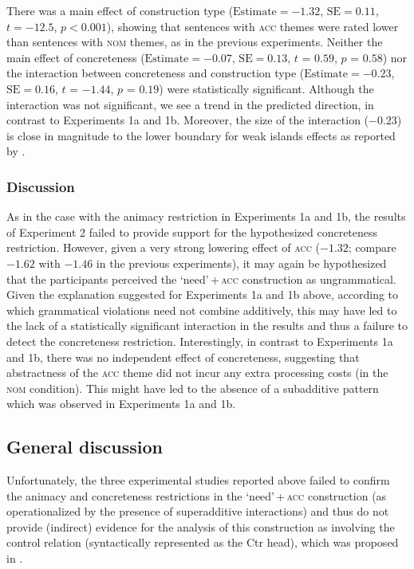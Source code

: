 \documentclass[output=paper]{langscibook}
\begin{document}
There was a main effect of construction type ($\text{Estimate} =-1.32$, $\text{SE} =0.11$, $t = -12.5$, $p < 0.001$), showing that sentences with \textsc{acc} themes were rated lower than sentences with \textsc{nom} themes, as in the previous experiments. Neither the main effect of concreteness ($\text{Estimate} =-0.07$, $\text{SE} =0.13$, $t$ = $0.59$, $p$ = $0.58$) nor the interaction between concreteness and construction type ($\text{Estimate} =-0.23$, $\text{SE} =0.16$, $t$ = $-1.44$, $p$ = $0.19$) were statistically significant. Although the interaction was not significant, we see a trend in the predicted direction, in contrast to Experiments 1a and 1b. Moreover, the size of the interaction ($-0.23$) is close in magnitude to the lower boundary for weak islands effects as reported by \citet{Kush.Lohndal.Sprouse2018}.

\subsubsection{Discussion}

As in the case with the animacy restriction in Experiments 1a and 1b, the results of Experiment 2 failed to provide support for the hypothesized concreteness restriction. However, given a very strong lowering effect of \textsc{acc} ($-1.32$; compare $-1.62$ with $-1.46$ in the previous experiments), it may again be hypothesized that the participants perceived the `need'\,+\,\textsc{acc} construction as ungrammatical. Given the explanation suggested for Experiments 1a and 1b above, according to which grammatical violations need not combine additively, this may have led to the lack of a statistically significant interaction in the results and thus a failure to detect the concreteness restriction. Interestingly, in contrast to Experiments 1a and 1b, there was no independent effect of concreteness, suggesting that abstractness of the \textsc{acc} theme did not incur any extra processing costs (in the \textsc{nom} condition). This might have led to the absence of a subadditive pattern which was observed in Experiments 1a and 1b.

\subsection{General discussion}

Unfortunately, the three experimental studies reported above failed to confirm the animacy and concreteness restrictions in the `need'\,+\,\textsc{acc} construction (as operationalized by the presence of superadditive interactions) and thus do not provide (indirect) evidence for the analysis of this construction as involving the control relation (syntactically represented as the Ctr head), which was proposed in .
\end{document}
